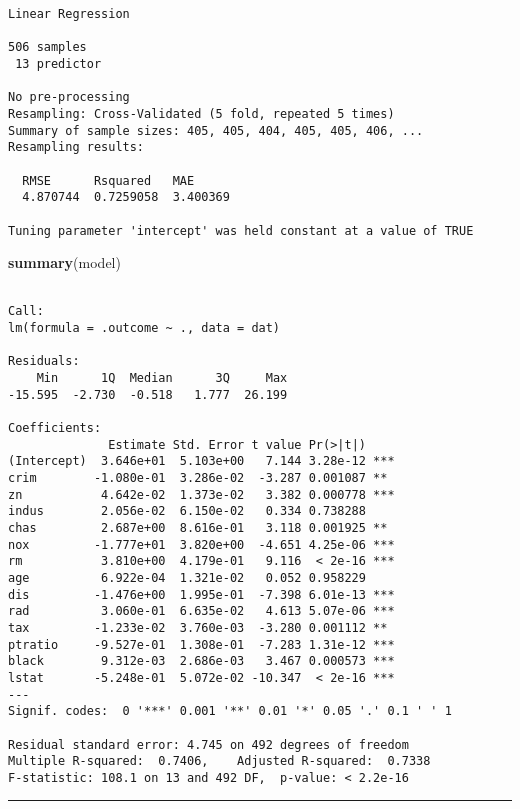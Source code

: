 \documentclass[]{book}
\newenvironment{Shaded}{\begin{snugshade}}{\end{snugshade}}
\newcommand{\KeywordTok}[1]{\textcolor[rgb]{0.13,0.29,0.53}{\textbf{#1}}}
\newcommand{\NormalTok}[1]{#1}
\begin{document}
\begin{verbatim}
Linear Regression 

506 samples
 13 predictor

No pre-processing
Resampling: Cross-Validated (5 fold, repeated 5 times) 
Summary of sample sizes: 405, 405, 404, 405, 405, 406, ... 
Resampling results:

  RMSE      Rsquared   MAE     
  4.870744  0.7259058  3.400369

Tuning parameter 'intercept' was held constant at a value of TRUE
\end{verbatim}

\begin{Shaded}
\begin{Highlighting}[]
\KeywordTok{summary}\NormalTok{(model)}
\end{Highlighting}
\end{Shaded}

\begin{verbatim}

Call:
lm(formula = .outcome ~ ., data = dat)

Residuals:
    Min      1Q  Median      3Q     Max 
-15.595  -2.730  -0.518   1.777  26.199 

Coefficients:
              Estimate Std. Error t value Pr(>|t|)    
(Intercept)  3.646e+01  5.103e+00   7.144 3.28e-12 ***
crim        -1.080e-01  3.286e-02  -3.287 0.001087 ** 
zn           4.642e-02  1.373e-02   3.382 0.000778 ***
indus        2.056e-02  6.150e-02   0.334 0.738288    
chas         2.687e+00  8.616e-01   3.118 0.001925 ** 
nox         -1.777e+01  3.820e+00  -4.651 4.25e-06 ***
rm           3.810e+00  4.179e-01   9.116  < 2e-16 ***
age          6.922e-04  1.321e-02   0.052 0.958229    
dis         -1.476e+00  1.995e-01  -7.398 6.01e-13 ***
rad          3.060e-01  6.635e-02   4.613 5.07e-06 ***
tax         -1.233e-02  3.760e-03  -3.280 0.001112 ** 
ptratio     -9.527e-01  1.308e-01  -7.283 1.31e-12 ***
black        9.312e-03  2.686e-03   3.467 0.000573 ***
lstat       -5.248e-01  5.072e-02 -10.347  < 2e-16 ***
---
Signif. codes:  0 '***' 0.001 '**' 0.01 '*' 0.05 '.' 0.1 ' ' 1

Residual standard error: 4.745 on 492 degrees of freedom
Multiple R-squared:  0.7406,    Adjusted R-squared:  0.7338 
F-statistic: 108.1 on 13 and 492 DF,  p-value: < 2.2e-16
\end{verbatim}

\begin{center}\rule{0.5\linewidth}{\linethickness}\end{center}
\end{document}

